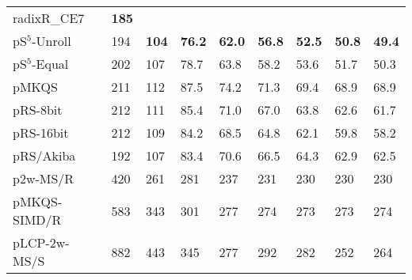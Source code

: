 \documentclass[a4paper]{myjournal}
\begin{document}
\begin{table}
\begin{tabularx}{\linewidth}{l|*{8}{>{\hfill}X}|@{}}
radixR\_CE7 & \bf 185 &  &  &  &  &  &  &  \\
pS$^5$-Unroll & 194 & \bf 104 & \bf 76.2 & \bf 62.0 & \bf 56.8 & \bf 52.5 & \bf 50.8 & \bf 49.4 \\
 pS$^5$-Equal & 202 &     107 &     78.7 &     63.8 &     58.2 &     53.6 &     51.7 &     50.3 \\
        pMKQS & 211 &     112 &     87.5 &     74.2 &     71.3 &     69.4 &     68.9 &     68.9 \\
     pRS-8bit & 212 &     111 &     85.4 &     71.0 &     67.0 &     63.8 &     62.6 &     61.7 \\
    pRS-16bit & 212 &     109 &     84.2 &     68.5 &     64.8 &     62.1 &     59.8 &     58.2 \\
    pRS/Akiba & 192 &     107 &     83.4 &     70.6 &     66.5 &     64.3 &     62.9 &     62.5 \\
     p2w-MS/R & 420 &     261 &      281 &      237 &      231 &      230 &      230 &      230 \\
 pMKQS-SIMD/R & 583 &     343 &      301 &      277 &      274 &      273 &      273 &      274 \\
 pLCP-2w-MS/S & 882 &     443 &      345 &      277 &      292 &      282 &      252 &      264 \\ \hline
\end{tabularx}
\end{table}
\end{document}
